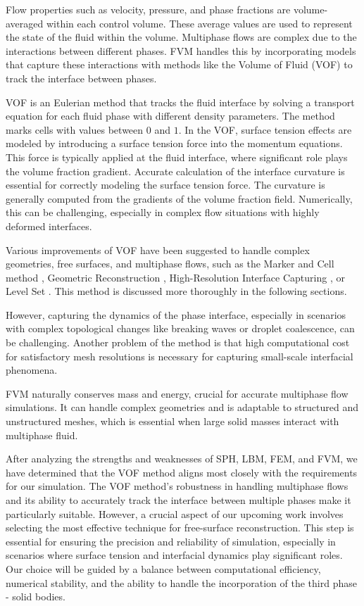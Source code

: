 Flow properties such as velocity, pressure, and phase fractions are volume-averaged within each control volume. These average values are used to represent the state of the fluid within the volume. Multiphase flows are complex due to the interactions between different phases. FVM handles this by incorporating models that capture these interactions with methods like the Volume of Fluid (VOF) to track the interface between phases. 

VOF is an Eulerian method that tracks the fluid interface by solving a transport equation for each fluid phase with different density parameters. The method marks cells with values between $0$ and $1$. In the VOF, surface tension effects are modeled by introducing a surface tension force into the momentum equations. This force is typically applied at the fluid interface, where significant role plays the volume fraction gradient. Accurate calculation of the interface curvature is essential for correctly modeling the surface tension force. The curvature is generally computed from the gradients of the volume fraction field. Numerically, this can be challenging, especially in complex flow situations with highly deformed interfaces.

Various improvements of VOF have been suggested to handle complex geometries, free surfaces, and multiphase flows, such as the Marker and Cell method \cite{mac}, Geometric Reconstruction \cite{VOF_reocnstr}, High-Resolution Interface Capturing \cite{HIRC}, or Level Set \cite{VOF_level_set}. This method is discussed more thoroughly in the following sections. 

However, capturing the dynamics of the phase interface, especially in scenarios with complex topological changes like breaking waves or droplet coalescence, can be challenging. Another problem of the method is that high computational cost for satisfactory mesh resolutions is necessary for capturing small-scale interfacial phenomena. 

FVM naturally conserves mass and energy, crucial for accurate multiphase flow simulations. It can handle complex geometries and is adaptable to structured and unstructured meshes, which is essential when large solid masses interact with multiphase fluid.

After analyzing the strengths and weaknesses of SPH, LBM, FEM, and FVM, we have determined that the VOF method aligns most closely with the requirements for our simulation. The VOF method's robustness in handling multiphase flows and its ability to accurately track the interface between multiple phases make it particularly suitable. However, a crucial aspect of our upcoming work involves selecting the most effective technique for free-surface reconstruction. This step is essential for ensuring the precision and reliability of simulation, especially in scenarios where surface tension and interfacial dynamics play significant roles. Our choice will be guided by a balance between computational efficiency, numerical stability, and the ability to handle the incorporation of the third phase - solid bodies.

